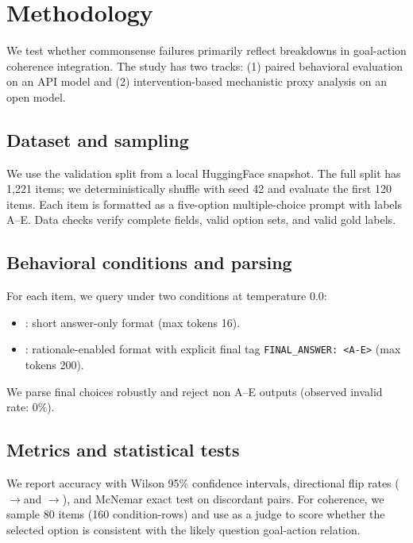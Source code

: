 \section{Methodology}
\label{sec:method}

We test whether commonsense failures primarily reflect breakdowns in goal-action coherence integration. The study has two tracks: (1) paired behavioral evaluation on an API model and (2) intervention-based mechanistic proxy analysis on an open model.

\subsection*{Dataset and sampling}
We use the \csqa validation split from a local HuggingFace snapshot. The full split has 1,221 items; we deterministically shuffle with seed 42 and evaluate the first 120 items. Each item is formatted as a five-option multiple-choice prompt with labels A--E. Data checks verify complete fields, valid option sets, and valid gold labels.

\subsection*{Behavioral conditions and parsing}
For each item, we query \gptapi under two conditions at temperature 0.0:
\begin{itemize}
    \item \direct: short answer-only format (max tokens 16).
    \item \cotprompt: rationale-enabled format with explicit final tag \texttt{FINAL\_ANSWER: <A-E>} (max tokens 200).
\end{itemize}
We parse final choices robustly and reject non A--E outputs (observed invalid rate: 0\%).

\subsection*{Metrics and statistical tests}
We report accuracy with Wilson 95\% confidence intervals, directional flip rates (\direct$\rightarrow$\cotprompt and \cotprompt$\rightarrow$\direct), and McNemar exact test on discordant pairs. For coherence, we sample 80 items (160 condition-rows) and use \gptapi as a judge to score whether the selected option is consistent with the likely question goal-action relation.

